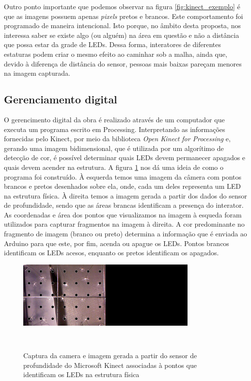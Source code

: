 Outro ponto importante que podemos observar na figura \ref{fig:kinect_exemplo} é que as imagens possuem apenas \textit{pixels} pretos e brancos. Este comportamento foi programado de maneira intencional. Isto porque, no âmbito desta proposta, nos interessa saber se existe algo (ou alguém) na área em questão e não a distância que possa estar da grade de LEDs. Dessa forma, interatores de diferentes estaturas podem criar o mesmo efeito ao caminhar sob a malha, ainda que, devido à diferença de distância do sensor, pessoas mais baixas pareçam menores na imagem capturada.


\subsection{Gerenciamento digital}

O gerencimento digital da obra é realizado através de um computador que executa um programa escrito em Processing. Interpretando as informações fornecidas pelo Kinect, por meio da biblioteca \textit{Open Kinect for Processing} e, gerando uma imagem bidimensional, que é utilizada por um algorítimo de detecção de cor, é possível determinar quais LEDs devem permanecer apagados e quais devem acender na estrutura. A figura \ref{fig:script} nos dá uma ideia de como o programa foi construído. À esquerda temos uma imagem da câmera com pontos brancos e pretos desenhados sobre ela, onde, cada um deles representa um LED na estrutura física. À direita temos a imagem gerada a partir dos dados do sensor de profundidade, sendo que as áreas brancas identificam a presença do interator. As coordenadas e área dos pontos que visualizamos na imagem à esqueda foram utilizados para capturar fragmentos na imagem à direita. A cor predominante no fragmento de imagem (branco ou preto) determina a informação que é enviada ao Arduino para que este, por fim, acenda ou apague os LEDs. Pontos brancos identificam os LEDs acesos, enquanto os pretos identificam os apagados.

\begin{figure}[H]
  \begin{center}
    \caption{Captura da camera e imagem gerada a partir do sensor de profundidade do Microsoft Kinect associadas à pontos que identificam os LEDs na estrutura física}
    \vspace*{0,2cm}
    \includegraphics[width=0.8\textwidth]{./04-figuras/script}
    \label{fig:script}
  \end{center}
  \vspace*{-0,5cm}
  \\
\end{figure}

